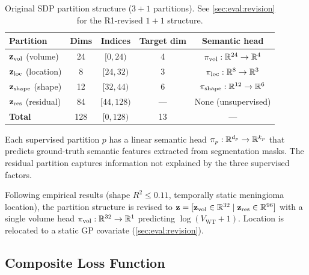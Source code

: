 \begin{table}[H]
  \centering
  \caption{Original SDP partition structure ($3+1$ partitions). See
    \cref{sec:eval:revision} for the R1-revised $1+1$ structure.}
  \label{tab:partitions}
  \begin{tabular}{lcccc}
    \toprule
    \textbf{Partition} & \textbf{Dims} & \textbf{Indices} &
      \textbf{Target dim} & \textbf{Semantic head} \\
    \midrule
    $\mathbf{z}_{\text{vol}}$ (volume)   & 24 & $[0, 24)$    & 4 & $\pi_{\text{vol}}: \mathbb{R}^{24} \to \mathbb{R}^4$ \\
    $\mathbf{z}_{\text{loc}}$ (location) & 8  & $[24, 32)$   & 3 & $\pi_{\text{loc}}: \mathbb{R}^{8} \to \mathbb{R}^3$ \\
    $\mathbf{z}_{\text{shape}}$ (shape)  & 12 & $[32, 44)$   & 6 & $\pi_{\text{shape}}: \mathbb{R}^{12} \to \mathbb{R}^6$ \\
    $\mathbf{z}_{\text{res}}$ (residual) & 84 & $[44, 128)$  & --- & None (unsupervised) \\
    \midrule
    \textbf{Total}    & 128 & $[0, 128)$ & 13 & --- \\
    \bottomrule
  \end{tabular}
\end{table}

Each supervised partition $p$ has a linear semantic head
$\pi_p: \mathbb{R}^{d_p} \to \mathbb{R}^{k_p}$ that predicts ground-truth semantic features
extracted from segmentation masks. The residual partition captures
information not explained by the three supervised factors.

\begin{remark}[R1 Revision]
  Following empirical results (shape $R^2 \leq 0.11$, temporally static
  meningioma location), the partition structure is revised to
  $\mathbf{z} = [\mathbf{z}_{\text{vol}} \in \mathbb{R}^{32} \mid \mathbf{z}_{\text{res}} \in \mathbb{R}^{96}]$ with a single
  volume head $\pi_{\text{vol}}: \mathbb{R}^{32} \to \mathbb{R}^1$ predicting
  $\log(V_{\text{WT}} + 1)$. Location is relocated to a static GP covariate
  (\cref{sec:eval:revision}).
\end{remark}

\subsection{Composite Loss Function}
\label{sec:sdp:loss}

